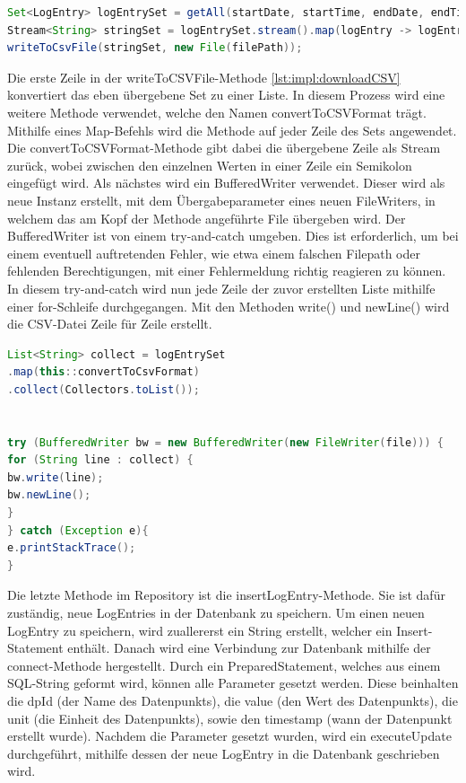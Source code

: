 \begin{lstlisting}[language=java,caption=LogEntrySet zu CSV umwandeln,label=lst:impl:logEntryZuCSV]
Set<LogEntry> logEntrySet = getAll(startDate, startTime, endDate, endTime);
Stream<String> stringSet = logEntrySet.stream().map(logEntry -> logEntry.toString());
writeToCsvFile(stringSet, new File(filePath));
\end{lstlisting}


Die erste Zeile in der writeToCSVFile-Methode \ref{lst:impl:downloadCSV} konvertiert das eben übergebene Set zu einer Liste. In diesem Prozess wird eine weitere Methode verwendet, welche den Namen convertToCSVFormat trägt. Mithilfe eines Map-Befehls wird die Methode auf jeder Zeile des Sets angewendet. Die convertToCSVFormat-Methode gibt dabei die übergebene Zeile als Stream zurück, wobei zwischen den einzelnen Werten in einer Zeile ein Semikolon eingefügt wird.
Als nächstes wird ein BufferedWriter verwendet. Dieser wird als neue Instanz erstellt, mit dem Übergabeparameter eines neuen FileWriters, in welchem das am Kopf der Methode angeführte File übergeben wird. Der BufferedWriter ist von einem try-and-catch umgeben. Dies ist erforderlich, um bei einem eventuell auftretenden Fehler, wie etwa einem falschen Filepath oder fehlenden Berechtigungen, mit einer Fehlermeldung richtig reagieren zu können. In diesem try-and-catch wird nun jede Zeile der zuvor erstellten Liste mithilfe einer for-Schleife durchgegangen. Mit den Methoden write() und newLine() wird die CSV-Datei Zeile für Zeile erstellt.


\begin{lstlisting}[language=java,caption=CSV-File herunterladen,label=lst:impl:downloadCSV]
List<String> collect = logEntrySet
.map(this::convertToCsvFormat)
.collect(Collectors.toList());


try (BufferedWriter bw = new BufferedWriter(new FileWriter(file))) {
for (String line : collect) {
bw.write(line);
bw.newLine();
}
} catch (Exception e){
e.printStackTrace();
}
\end{lstlisting}


Die letzte Methode im Repository ist die insertLogEntry-Methode. Sie ist dafür zuständig, neue LogEntries in der Datenbank zu speichern. Um einen neuen LogEntry zu speichern, wird zuallererst ein String erstellt, welcher ein Insert-Statement enthält.
Danach wird eine Verbindung zur Datenbank mithilfe der connect-Methode hergestellt. Durch ein PreparedStatement, welches aus einem SQL-String geformt wird, können alle Parameter gesetzt werden. Diese beinhalten die dpId (der Name des Datenpunkts), die value (den Wert des Datenpunkts), die unit (die Einheit des Datenpunkts), sowie den timestamp (wann der Datenpunkt erstellt wurde). Nachdem die Parameter gesetzt wurden, wird ein executeUpdate durchgeführt, mithilfe dessen der neue LogEntry in die Datenbank geschrieben wird.


